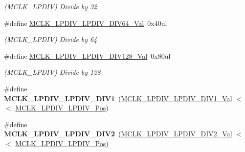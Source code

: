 \begin{DoxyCompactItemize}
\begin{DoxyCompactList}\small\item\em (M\+C\+L\+K\+\_\+\+L\+P\+D\+I\+V) Divide by 32 \end{DoxyCompactList}\item 
\hypertarget{group___s_a_m_l21___m_c_l_k_gac4fb37777ca79177c4978c771ee1aa5c}{}\#define \hyperlink{group___s_a_m_l21___m_c_l_k_gac4fb37777ca79177c4978c771ee1aa5c}{M\+C\+L\+K\+\_\+\+L\+P\+D\+I\+V\+\_\+\+L\+P\+D\+I\+V\+\_\+\+D\+I\+V64\+\_\+\+Val}~0x40ul\label{group___s_a_m_l21___m_c_l_k_gac4fb37777ca79177c4978c771ee1aa5c}

\begin{DoxyCompactList}\small\item\em (M\+C\+L\+K\+\_\+\+L\+P\+D\+I\+V) Divide by 64 \end{DoxyCompactList}\item 
\hypertarget{group___s_a_m_l21___m_c_l_k_ga64472f172aa67a75e94939e0792f6f6e}{}\#define \hyperlink{group___s_a_m_l21___m_c_l_k_ga64472f172aa67a75e94939e0792f6f6e}{M\+C\+L\+K\+\_\+\+L\+P\+D\+I\+V\+\_\+\+L\+P\+D\+I\+V\+\_\+\+D\+I\+V128\+\_\+\+Val}~0x80ul\label{group___s_a_m_l21___m_c_l_k_ga64472f172aa67a75e94939e0792f6f6e}

\begin{DoxyCompactList}\small\item\em (M\+C\+L\+K\+\_\+\+L\+P\+D\+I\+V) Divide by 128 \end{DoxyCompactList}\item 
\hypertarget{group___s_a_m_l21___m_c_l_k_gac6c7e231ac115931e8979609dc00d561}{}\#define {\bfseries M\+C\+L\+K\+\_\+\+L\+P\+D\+I\+V\+\_\+\+L\+P\+D\+I\+V\+\_\+\+D\+I\+V1}~(\hyperlink{group___s_a_m_l21___m_c_l_k_gab7ad1f7299520f4cc271641d3c1d45af}{M\+C\+L\+K\+\_\+\+L\+P\+D\+I\+V\+\_\+\+L\+P\+D\+I\+V\+\_\+\+D\+I\+V1\+\_\+\+Val}     $<$$<$ \hyperlink{group___s_a_m_l21___m_c_l_k_gad9275e73d38bc33c74fe1d10e17e0023}{M\+C\+L\+K\+\_\+\+L\+P\+D\+I\+V\+\_\+\+L\+P\+D\+I\+V\+\_\+\+Pos})\label{group___s_a_m_l21___m_c_l_k_gac6c7e231ac115931e8979609dc00d561}

\item 
\hypertarget{group___s_a_m_l21___m_c_l_k_gadb426cd1e3f677a470acdb0f086206c6}{}\#define {\bfseries M\+C\+L\+K\+\_\+\+L\+P\+D\+I\+V\+\_\+\+L\+P\+D\+I\+V\+\_\+\+D\+I\+V2}~(\hyperlink{group___s_a_m_l21___m_c_l_k_gac227ee23da578cc1218555697aceb4b8}{M\+C\+L\+K\+\_\+\+L\+P\+D\+I\+V\+\_\+\+L\+P\+D\+I\+V\+\_\+\+D\+I\+V2\+\_\+\+Val}     $<$$<$ \hyperlink{group___s_a_m_l21___m_c_l_k_gad9275e73d38bc33c74fe1d10e17e0023}{M\+C\+L\+K\+\_\+\+L\+P\+D\+I\+V\+\_\+\+L\+P\+D\+I\+V\+\_\+\+Pos})\label{group___s_a_m_l21___m_c_l_k_gadb426cd1e3f677a470acdb0f086206c6}


\end{DoxyCompactItemize}
